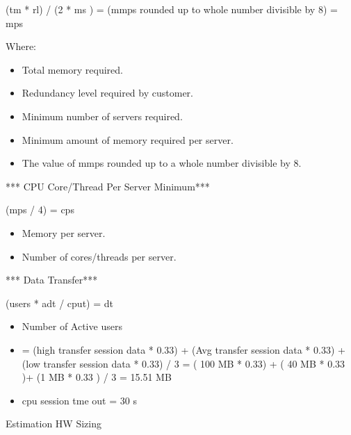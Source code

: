 \documentclass[letterpaper,10pt,english]{sphinxmanual}
\begin{document}

(tm * rl) / (2 * ms ) = (mmps rounded up to whole number divisible by 8) = mps

Where:
\begin{itemize}
\item {} 
 Total memory required.

\item {} 
 Redundancy level required by customer.

\item {} 
 Minimum number of servers required.

\item {} 
 Minimum amount of memory required per server.

\item {} 
 The value of mmps rounded up to a whole number divisible by 8.

\end{itemize}

*** CPU Core/Thread Per Server Minimum***

(mps / 4) = cps
\begin{itemize}
\item {} 
 Memory per server.

\item {} 
 Number of cores/threads per server.

\end{itemize}

*** Data Transfer***

(users * adt / cput) = dt
\begin{itemize}
\item {} 
 Number of Active users

\item {} 
  = (high transfer session data  * 0.33) +  (Avg transfer session data  * 0.33) + (low transfer session data  * 0.33) / 3 =  ( 100 MB * 0.33) + ( 40 MB * 0.33 )+ (1 MB * 0.33 ) / 3 = 15.51 MB

\item {} 
  cpu  session tme out  = 30 s

\end{itemize}

Estimation HW Sizing
\end{document}
